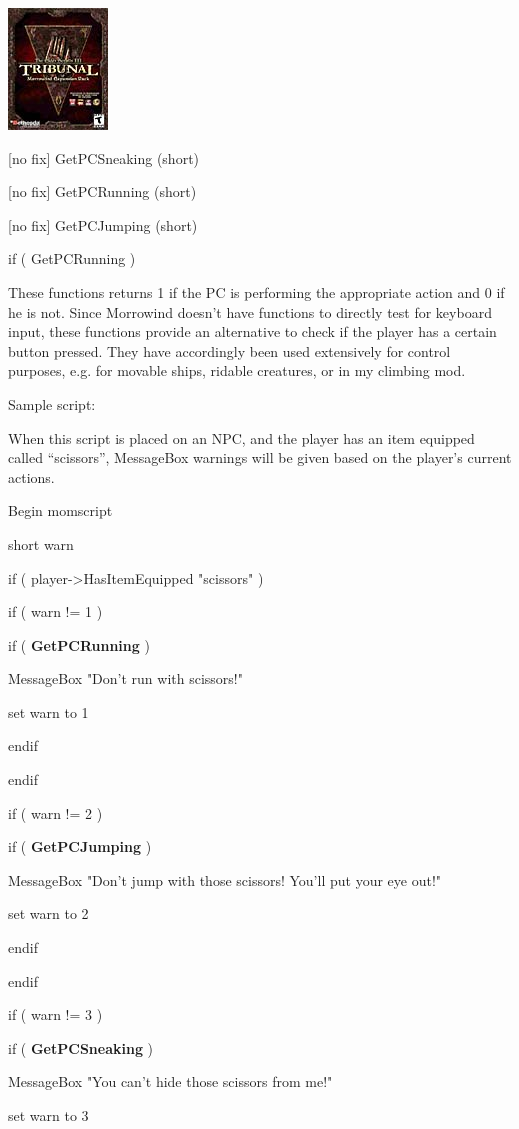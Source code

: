 \documentclass[
]{article}
\begin{document}
\includegraphics{media/image6.png}

{[}no fix{]} GetPCSneaking (short)

{[}no fix{]} GetPCRunning (short)

{[}no fix{]} GetPCJumping (short)

if ( GetPCRunning )

These functions returns 1 if the PC is performing the appropriate action
and 0 if he is not. Since Morrowind doesn't have functions to directly
test for keyboard input, these functions provide an alternative to check
if the player has a certain button pressed. They have accordingly been
used extensively for control purposes, e.g. for movable ships, ridable
creatures, or in my climbing mod.

Sample script:

When this script is placed on an NPC, and the player has an item
equipped called ``scissors'', MessageBox warnings will be given based on
the player's current actions.

Begin momscript

short warn

if ( player-\textgreater HasItemEquipped "scissors" )

if ( warn != 1 )

if ( \textbf{GetPCRunning} )

MessageBox "Don't run with scissors!"

set warn to 1

endif

endif

if ( warn != 2 )

if ( \textbf{GetPCJumping} )

MessageBox "Don't jump with those scissors! You'll put your eye out!"

set warn to 2

endif

endif

if ( warn != 3 )

if ( \textbf{GetPCSneaking} )

MessageBox "You can't hide those scissors from me!"

set warn to 3
\end{document}

